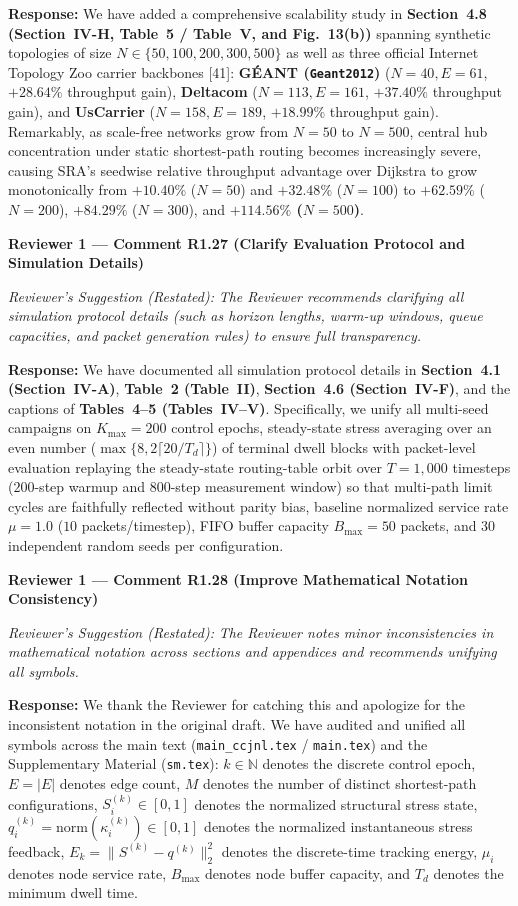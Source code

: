 \documentclass[11pt,a4paper]{article}
\newcommand{\cbox}[2]{%
  \vspace{0.6em}\noindent\textbf{#1}\par\smallskip
  \noindent\textit{Reviewer's Suggestion (Restated):} \textit{#2}\par\smallskip
}
\begin{document}
\noindent\textbf{Response:} We have added a comprehensive scalability study in \textbf{Section~4.8 (Section~IV-H, Table~5 / Table~V, and Fig.~13(b))} spanning synthetic topologies of size $N \in \{50, 100, 200, 300, 500\}$ as well as three official Internet Topology Zoo carrier backbones [41]: \textbf{G\'EANT (\texttt{Geant2012})} ($N=40, E=61$, $+28.64\%$ throughput gain), \textbf{Deltacom} ($N=113, E=161$, $+37.40\%$ throughput gain), and \textbf{UsCarrier} ($N=158, E=189$, $+18.99\%$ throughput gain). Remarkably, as scale-free networks grow from $N=50$ to $N=500$, central hub concentration under static shortest-path routing becomes increasingly severe, causing SRA's seedwise relative throughput advantage over Dijkstra to grow monotonically from $+10.40\%$ ($N=50$) and $+32.48\%$ ($N=100$) to $+62.59\%$ ($N=200$), $+84.29\%$ ($N=300$), and \textbf{$+114.56\%$ ($N=500$)}.

\hrulefill

\cbox{Reviewer 1 --- Comment R1.27 (Clarify Evaluation Protocol and Simulation Details)}{The Reviewer recommends clarifying all simulation protocol details (such as horizon lengths, warm-up windows, queue capacities, and packet generation rules) to ensure full transparency.}

\noindent\textbf{Response:} We have documented all simulation protocol details in \textbf{Section~4.1 (Section~IV-A)}, \textbf{Table~2 (Table~II)}, \textbf{Section~4.6 (Section~IV-F)}, and the captions of \textbf{Tables~4--5 (Tables~IV--V)}. Specifically, we unify all multi-seed campaigns on $K_{\max}=200$ control epochs, steady-state stress averaging over an even number ($\max\{8, 2\lceil 20/T_d\rceil\}$) of terminal dwell blocks with packet-level evaluation replaying the steady-state routing-table orbit over $T=1{,}000$ timesteps ($200$-step warmup and $800$-step measurement window) so that multi-path limit cycles are faithfully reflected without parity bias, baseline normalized service rate $\mu = 1.0$ ($10$ packets/timestep), FIFO buffer capacity $B_{\max} = 50$ packets, and 30 independent random seeds per configuration.

\hrulefill

\cbox{Reviewer 1 --- Comment R1.28 (Improve Mathematical Notation Consistency)}{The Reviewer notes minor inconsistencies in mathematical notation across sections and appendices and recommends unifying all symbols.}

\noindent\textbf{Response:} We thank the Reviewer for catching this and apologize for the inconsistent notation in the original draft. We have audited and unified all symbols across the main text (\texttt{main\_ccjnl.tex} / \texttt{main.tex}) and the Supplementary Material (\texttt{sm.tex}): $k \in \mathbb{N}$ denotes the discrete control epoch, $E = |E|$ denotes edge count, $M$ denotes the number of distinct shortest-path configurations, $S_i^{(k)} \in [0,1]$ denotes the normalized structural stress state, $q_i^{(k)} = \mathrm{norm}(\kappa_i^{(k)}) \in [0,1]$ denotes the normalized instantaneous stress feedback, $E_k = \|S^{(k)}-q^{(k)}\|_2^2$ denotes the discrete-time tracking energy, $\mu_i$ denotes node service rate, $B_{\max}$ denotes node buffer capacity, and $T_d$ denotes the minimum dwell time.
\end{document}
